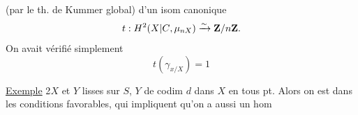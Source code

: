 (par le th. de Kummer global)
d'un isom canonique
\[
t:H^2(\relax{X|C},\mu_{nX})\xrightarrow{\sim}\mathbf Z/n\mathbf Z.
\]
On avait vérifié simplement
\[
t(\gamma_{x/X})=1
\]

\uline{Exemple} 2\quad $X$ et $Y$ lisses sur $S$, $Y$ de codim $d$ dans $X$ en tous pt. Alors on est dans les conditions favorables, qui impliquent qu'on a aussi un hom
